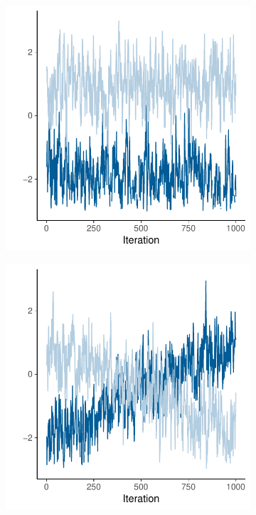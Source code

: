 \documentclass[american,]{article}
\theoremstyle{definition}
\begin{document}
\begin{figure}
\center
  \begin{subfigure}[b]{0.37\textwidth}
    \includegraphics[width=\textwidth]{graphics/convergechallenge1.pdf}
  \end{subfigure}
  \hspace{8mm}
\begin{subfigure}[b]{0.37\textwidth}
    \includegraphics[width=\textwidth]{graphics/convergechallenge2.pdf}

\end{subfigure}
\end{figure}
\end{document}
